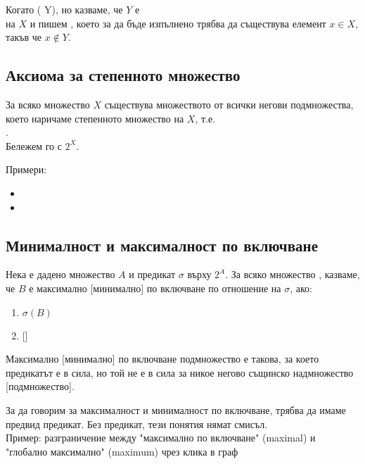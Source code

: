 Когато  ( Y), но  казваме, че \(Y\) е \\ 
 на \(X\) и пишем , което 
за да бъде изпълнено трябва да съществува елемент \(x \in X\), такъв че \(x \not \in Y\). 

\subsection{Аксиома за степенното множество}
За всяко множество \(X\) съществува множеството от всички негови подмножества, което наричаме 
степенното множество на \(X\), т.е. \\
. \\
Бележем го с \(2^X\).

Примери:
\begin{itemize}
    \item {}
    \item {}
\end{itemize}

\subsection{Минималност и максималност по включване}
Нека е дадено множество \(A\) и предикат \(\sigma\) върху \(2^A\).
За всяко множество , казваме, че \(B\) е максимално [минимално] по включване по 
отношение на \(\sigma\), ако:
\begin{enumerate}
    \item \(\sigma(B)\)
    \item {} []
\end{enumerate}

Максимално [минимално] по включване подмножество е такова, за което предикатът е в сила, но той не е в сила
за никое негово същинско надмножество [подмножество].

За да говорим за максималност и минималност по включване, трябва да имаме предвид предикат. Без предикат,
тези понятия нямат смисъл. \\

Пример: разграничение между "максимално по включване" (maximal) и "глобално максимално" (maximum) чрез клика в граф \\

